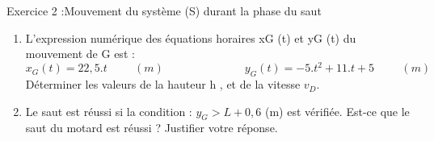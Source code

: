 \documentclass[12pt, french]{article}
\begin{document}
\begin{Box2}{Exercice 2 :Mouvement du système (S) durant la phase du saut }
\begin{enumerate}
	\item L’expression numérique des équations horaires xG (t) et yG (t) du mouvement de G est : $$x_G(t) = 22,5.t \hspace{1cm} (m) \hspace{3cm} y_G(t) = -5.t^2 +11.t + 5 \hspace{1cm} (m)$$
		Déterminer les valeurs de la hauteur h , et de la vitesse $v_D$.

	\item Le saut est réussi si la condition : $y_G > L+0,6$ (m) est vérifiée. Est-ce que le saut du motard est
réussi ? Justifier votre réponse.

\end{enumerate}




\end{Box2}
\end{document}
